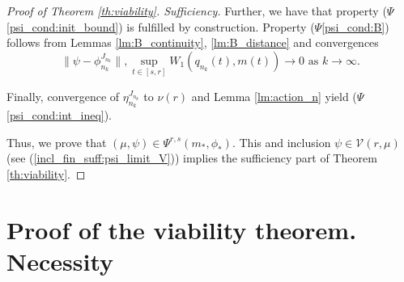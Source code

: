 \documentclass[a4paper,12pt]{article}
\begin{document}
\begin{proof}[Proof of Theorem \ref{th:viability}. Sufficiency]
	Further, we have that property ($\Psi$\ref{psi_cond:init_bound}) is fulfilled by construction. Property ($\Psi$\ref{psi_cond:B}) follows from Lemmas \ref{lm:B_continuity}, \ref{lm:B_distance} and convergences $$\|\psi-\phi_{n_k}^{J_{n_k}}\|, \sup_{t\in [s,r]}W_1(q_{n_k}(t),m(t))\rightarrow 0 \text{ as }k\rightarrow \infty.$$
	
	Finally, convergence of $\eta_{n_k}^{J_{n_k}}$ to $\nu(r)$ and Lemma \ref{lm:action_n} yield ($\Psi$\ref{psi_cond:int_ineq}).
	
	Thus, we prove that $(\mu,\psi)\in \Psi^{r,s}(m_*,\phi_*)$. This and inclusion
	$\psi\in\mathcal{V}(r,\mu)$ (see (\ref{incl_fin_suff:psi_limit_V})) implies the sufficiency part of Theorem \ref{th:viability}.
\end{proof}

\section{Proof of the viability theorem. Necessity}\label{sect:proof_necissity}
\end{document}
